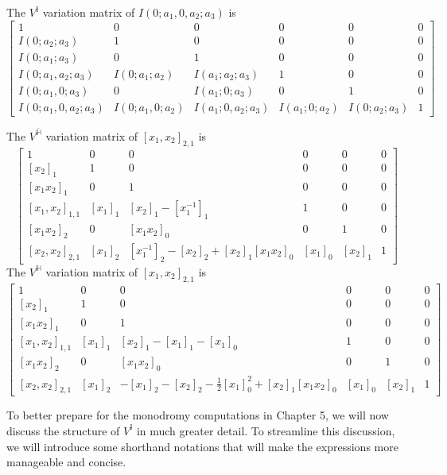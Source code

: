 \begin{example}\label{ex: V^I for I(0;a0,0,a2;a3)}
The $V^{\mathbb I}$ variation matrix of $I(0;a_1,0,a_2;a_3)$ is
\begin{equation}
\begin{bmatrix}
1&0&0&0&0&0\\
I(0;a_2;a_3)&1&0&0&0&0\\
I(0;a_1;a_3)&0&1&0&0&0\\
I(0;a_1,a_2;a_3)&I(0;a_1;a_2)&I(a_1;a_2;a_3)&1&0&0\\
I(0;a_1,0;a_3)&0&I(a_1;0;a_3)&0&1&0\\
I(0;a_1,0,a_2;a_3)&I(0;a_1,0;a_2)&I(a_1;0,a_2;a_3)&I(a_1;0;a_2)&I(0;a_2;a_3)&1
\end{bmatrix}
\end{equation}
\end{example}

\begin{example}\label{ex: V^Hbar and V^H or [x1,x2]_{2,1}}
The $V^{\overline{\mathbb H}}$ variation matrix of $[x_1,x_2]_{2,1}$ is
\begin{equation}
\begin{bmatrix}
1&0&0&0&0&0\\
[x_2]_1&1&0&0&0&0\\
[x_1x_2]_1&0&1&0&0&0\\
[x_1,x_2]_{1,1}&[x_1]_1&[x_2]_1-[x_1^{-1}]_1&1&0&0\\
[x_1x_2]_2&0&[x_1x_2]_0&0&1&0\\
[x_2,x_2]_{2,1}&[x_1]_2&[x_1^{-1}]_2-[x_2]_2+[x_2]_1[x_1x_2]_0&[x_1]_0&[x_2]_1&1
\end{bmatrix}
\end{equation}
The $V^{\mathbb H}$ variation matrix of $[x_1,x_2]_{2,1}$ is
\begin{equation}
\begin{bmatrix}
1&0&0&0&0&0\\
[x_2]_1&1&0&0&0&0\\
[x_1x_2]_1&0&1&0&0&0\\
[x_1,x_2]_{1,1}&[x_1]_1&[x_2]_1-[x_1]_1-[x_1]_0&1&0&0\\
[x_1x_2]_2&0&[x_1x_2]_0&0&1&0\\
[x_2,x_2]_{2,1}&[x_1]_2&-[x_1]_2-[x_2]_2-\frac{1}{2}[x_1]_0^2+[x_2]_1[x_1x_2]_0&[x_1]_0&[x_2]_1&1
\end{bmatrix}
\end{equation}
\end{example}

To better prepare for the monodromy computations in Chapter 5, we will now discuss the structure of $V^{\mathbb I}$ in much greater detail. To streamline this discussion, we will introduce some shorthand notations that will make the expressions more manageable and concise.


